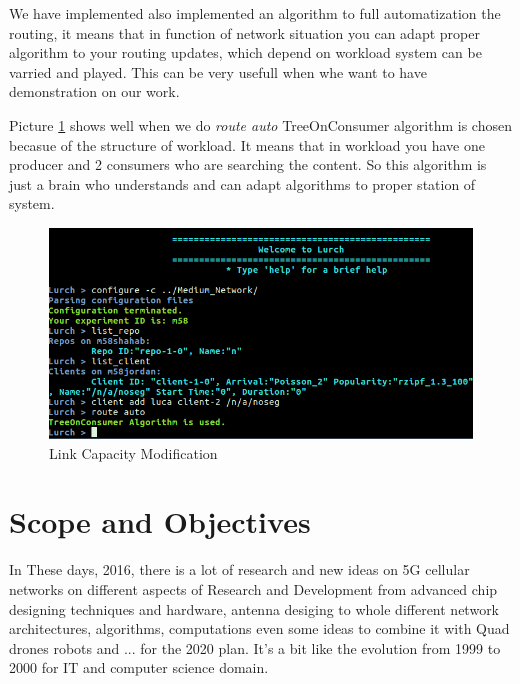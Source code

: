 We have implemented also implemented an algorithm to full automatization the routing, it means that in function of network situation you can adapt proper algorithm to your routing updates, which depend on workload system can be varried and played. This can be very usefull when whe want to have demonstration on our work.

Picture \ref{auto} shows well when we do \textit{route auto} TreeOnConsumer algorithm is chosen becasue of the structure of workload. It means that in workload you have one producer and 2 consumers who are searching the content. So this algorithm is just a brain who understands and can adapt algorithms to proper station of system.

\begin{figure}[H]

\begin{center}

\includegraphics[scale = 0.35]{Pictures/auto.png}

\caption{Link Capacity Modification} \label{auto} 

\end{center}

\end{figure}

 
\section{Scope and Objectives}
In These days, 2016,  there is a lot of research and new ideas on 5G cellular networks on different aspects of Research and Development from advanced chip designing techniques and hardware, antenna desiging to whole different network architectures, algorithms, computations even some ideas to combine it with Quad drones robots and ... for the 2020 plan. It's a bit like the evolution from 1999 to 2000 for IT and computer science domain.

